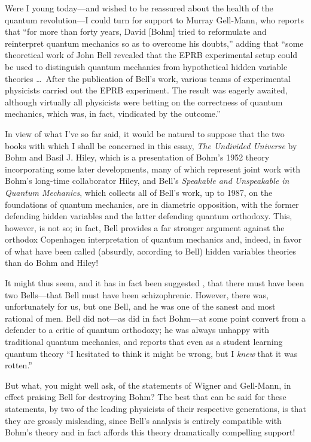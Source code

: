\documentclass[12pt]{article}
\begin{document}
Were I young today---and wished to be reassured about the health of the
quantum revolution---I could turn for support to Murray Gell-Mann, who
reports \cite{GM} that ``for more than forty years, David [Bohm] tried to
reformulate and reinterpret quantum mechanics so as to overcome his
doubts,'' adding that ``some theoretical work of John Bell revealed that
the EPRB experimental setup could be used to distinguish quantum mechanics
{}from hypothetical hidden variable theories \dots\  After the publication of
Bell's work, various teams of experimental physicists carried out the EPRB
experiment. The result was eagerly awaited, although virtually all
physicists were betting on the correctness of quantum mechanics, which was,
in fact, vindicated by the outcome.''

In view of what I've so far said, it would be natural to suppose that the
two books with which I shall be concerned in this essay, {\it The Undivided
Universe\/} by Bohm and Basil J. Hiley, which is a presentation of Bohm's
1952 theory incorporating some later developments, many of which represent
joint work with Bohm's long-time collaborator Hiley, and Bell's {\it
Speakable and Unspeakable in Quantum Mechanics\/}, which collects all of
Bell's work, up to 1987, on the foundations of quantum mechanics, are in
diametric opposition, with the former defending hidden variables and the
latter defending quantum orthodoxy. This, however, is not so; in fact, Bell
provides a far stronger argument against the orthodox Copenhagen
interpretation of quantum mechanics and, indeed, in favor of what have been
called (absurdly, according to Bell) hidden variables theories than do Bohm
and Hiley!

It might thus seem, and it has in fact been suggested \cite{Speiser}, that
there must have been two Bells---that Bell must have been
schizophrenic. However, there was, unfortunately for us, but one Bell, and
he was one of the sanest and most rational of men. Bell did not---as did in
fact Bohm---at some point convert from a defender to a critic of quantum
orthodoxy; he was always unhappy with traditional quantum mechanics, and
reports \cite{Bernstein} that even as a student learning quantum theory ``I
hesitated to think it might be wrong, but I {\it knew\/} that it was
rotten.''

But what, you might well ask, of the statements of Wigner and Gell-Mann, in
effect praising Bell for destroying Bohm?  The best that can be said for
these statements, by two of the leading physicists of their respective
generations, is that they are grossly misleading, since Bell's analysis is
entirely compatible with Bohm's theory and in fact affords this theory
dramatically compelling support!
\end{document}
